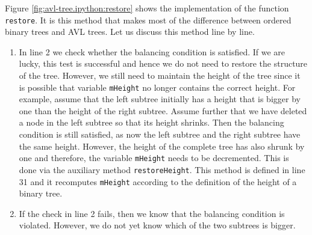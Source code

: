 Figure \ref{fig:avl-tree.ipython:restore} shows the implementation of the function \texttt{restore}.
It is this method that makes most of the difference between ordered binary trees and AVL trees.  Let
us discuss this method line by line.
\begin{enumerate}
\item In line 2 we check whether the balancing condition is satisfied.  If we are lucky,  this test 
      is successful and hence we do not need to restore the structure of the tree.  However, we
      still need to maintain the height of the tree since it is possible that variable
      \texttt{mHeight} no longer contains the correct height.  For example, assume that the left subtree
      initially has a height that is bigger by one than the height of the right subtree.  Assume
      further that we have deleted a node in the left subtree so that its height shrinks.  Then the
      balancing condition is still satisfied, as now the left subtree and the right subtree have the
      same height.  However, the height of the complete tree has also shrunk by one and therefore, 
      the variable \texttt{mHeight} needs to be decremented.  This is done via the auxiliary method
      \texttt{restoreHeight}.  This method is defined in line 31 and it recomputes \texttt{mHeight}
      according to the definition of the height of a binary tree.
\item If the check in line 2 fails, then we know that the balancing condition is violated.
      However, we do not yet know which of the two subtrees is bigger.  


\end{enumerate}
